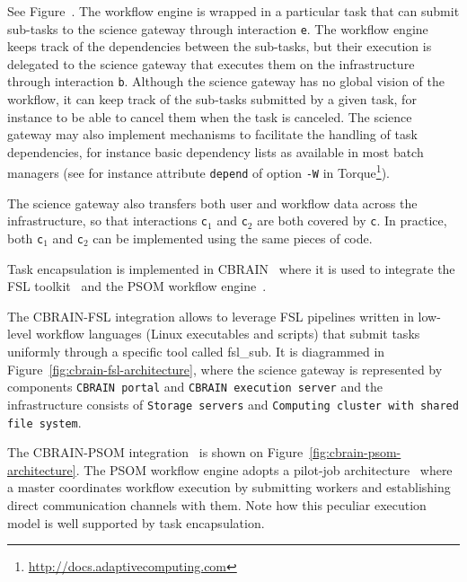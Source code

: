 \documentclass[preprint,3p,twocolumn]{elsarticle}
\begin{document}
See Figure~. The workflow engine is wrapped in
a particular task that can submit sub-tasks to the science gateway
through interaction \texttt{e}. The workflow engine keeps track of the
dependencies between the sub-tasks, but their execution is delegated
to the science gateway that executes them on the infrastructure
through interaction \texttt{b}. Although the science gateway has no
global vision of the workflow, it can keep track of the sub-tasks
submitted by a given task, for instance to be able to cancel them when
the task is canceled. The science gateway may also implement
mechanisms to facilitate the handling of task dependencies, for
instance basic dependency lists as available in most batch managers
(see for instance attribute \texttt{depend} of option \texttt{-W} in
Torque\footnote{\url{http://docs.adaptivecomputing.com}}).

The science gateway also transfers both user and workflow data across
the infrastructure, so that interactions \texttt{c$_1$} and
\texttt{c$_2$} are both covered by \texttt{c}. In practice, both
\texttt{c$_1$} and \texttt{c$_2$} can be implemented using the same
pieces of code.

Task encapsulation is implemented in CBRAIN~\cite{SHER-14} where it is
used to integrate the FSL toolkit~\cite{Jenkinson2012782} and the PSOM
workflow engine~\cite{bellec2012pipeline}.

The CBRAIN-FSL integration allows to leverage FSL pipelines written in
low-level workflow languages (Linux executables and scripts) that
submit tasks uniformly through a specific tool called fsl\_sub. It is
diagrammed in Figure~\ref{fig:cbrain-fsl-architecture}, where the
science gateway is represented by components \texttt{CBRAIN portal}
and \texttt{CBRAIN execution server} and the infrastructure consists
of \texttt{Storage servers} and \texttt{Computing cluster with shared
  file system}.

The CBRAIN-PSOM integration~\cite{GLAT-16} is shown on
Figure~\ref{fig:cbrain-psom-architecture}. The PSOM workflow engine
adopts a pilot-job architecture~\cite{turilli2015comprehensive} where
a master coordinates workflow execution by submitting workers and
establishing direct communication channels with them. Note how this
peculiar execution model is well supported by task encapsulation.
\end{document}
